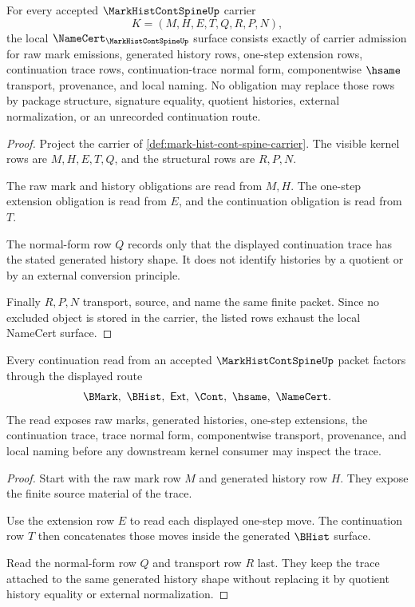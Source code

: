\begin{theorem}
\label{thm:mark-hist-cont-spine-obligations}
For every accepted $\MarkHistContSpineUp$ carrier
$$
K=(M,H,E,T,Q,R,P,N),
$$
the local $\NameCert_{\MarkHistContSpineUp}$ surface consists exactly of carrier admission for raw mark emissions, generated history rows, one-step extension rows, continuation trace rows, continuation-trace normal form, componentwise $\hsame$ transport, provenance, and local naming. No obligation may replace those rows by package structure, signature equality, quotient histories, external normalization, or an unrecorded continuation route.
\end{theorem}
\begin{proof}
Project the carrier of \autoref{def:mark-hist-cont-spine-carrier}. The visible kernel rows are $M,H,E,T,Q$, and the structural rows are $R,P,N$.

The raw mark and history obligations are read from $M,H$. The one-step extension obligation is read from $E$, and the continuation obligation is read from $T$.

The normal-form row $Q$ records only that the displayed continuation trace has the stated generated history shape. It does not identify histories by a quotient or by an external conversion principle.

Finally $R,P,N$ transport, source, and name the same finite packet. Since no excluded object is stored in the carrier, the listed rows exhaust the local NameCert surface.
\end{proof}

\begin{theorem}
\label{thm:mark-hist-cont-spine-continuation-trace}
Every continuation read from an accepted $\MarkHistContSpineUp$ packet factors through the displayed route
$$
\BMark,\ \BHist,\ \mathsf{Ext},\ \Cont,\ \hsame,\ \NameCert .
$$
The read exposes raw marks, generated histories, one-step extensions, the continuation trace, trace normal form, componentwise transport, provenance, and local naming before any downstream kernel consumer may inspect the trace.
\end{theorem}
\begin{proof}
Start with the raw mark row $M$ and generated history row $H$. They expose the finite source material of the trace.

Use the extension row $E$ to read each displayed one-step move. The continuation row $T$ then concatenates those moves inside the generated $\BHist$ surface.

Read the normal-form row $Q$ and transport row $R$ last. They keep the trace attached to the same generated history shape without replacing it by quotient history equality or external normalization.
\end{proof}


